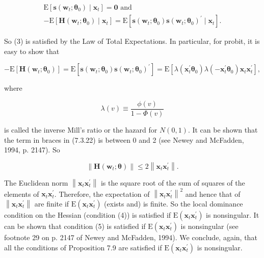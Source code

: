 \documentclass[10pt]{article}
\begin{document}
\begin{gather*}
\mathrm{E}\left[\mathbf{s}\left(\mathbf{w}_{t} ; \boldsymbol{\theta}_{0}\right) \mid \mathbf{x}_{t}\right]=\mathbf{0} \text { and } \\
-\mathrm{E}\left[\mathbf{H}\left(\mathbf{w}_{t} ; \boldsymbol{\theta}_{0}\right) \mid \mathbf{x}_{t}\right]=\mathrm{E}\left[\mathbf{s}\left(\mathbf{w}_{t} ; \boldsymbol{\theta}_{0}\right) \mathbf{s}\left(\mathbf{w}_{t} ; \boldsymbol{\theta}_{0}\right)^{\prime} \mid \mathbf{x}_{t}\right] . \tag{7.3.23}
\end{gather*}


So (3) is satisfied by the Law of Total Expectations. In particular, for probit, it is easy to show that


\begin{equation*}
-\mathrm{E}\left[\mathbf{H}\left(\mathbf{w}_{t} ; \boldsymbol{\theta}_{0}\right)\right]=\mathrm{E}\left[\mathbf{s}\left(\mathbf{w}_{t} ; \boldsymbol{\theta}_{0}\right) \mathbf{s}\left(\mathbf{w}_{t} ; \boldsymbol{\theta}_{0}\right)^{\prime}\right]=\mathrm{E}\left[\lambda\left(\mathbf{x}_{t}^{\prime} \boldsymbol{\theta}_{0}\right) \lambda\left(-\mathbf{x}_{t}^{\prime} \boldsymbol{\theta}_{0}\right) \mathbf{x}_{t} \mathbf{x}_{t}^{\prime}\right], \tag{7.3.24}
\end{equation*}


where


\begin{equation*}
\lambda(v) \equiv \frac{\phi(v)}{1-\Phi(v)} \tag{7.3.25}
\end{equation*}


is called the inverse Mill's ratio or the hazard for $N(0,1)$. It can be shown that the term in braces in (7.3.22) is between 0 and 2 (see Newey and McFadden, 1994, p. 2147). So


\begin{equation*}
\left\|\mathbf{H}\left(\mathbf{w}_{t} ; \boldsymbol{\theta}\right)\right\| \leq 2\left\|\mathbf{x}_{t} \mathbf{x}_{t}^{\prime}\right\| . \tag{7.3.26}
\end{equation*}


The Euclidean norm $\left\|\mathbf{x}_{t} \mathbf{x}_{t}^{\prime}\right\|$ is the square root of the sum of squares of the elements of $\mathbf{x}_{t} \mathbf{x}_{t}^{\prime}$. Therefore, the expectation of $\left\|\mathbf{x}_{t} \mathbf{x}_{t}^{\prime}\right\|^{2}$ and hence that of $\left\|\mathbf{x}_{t} \mathbf{x}_{t}^{\prime}\right\|$ are finite if $\mathrm{E}\left(\mathbf{x}_{t} \mathbf{x}_{t}^{\prime}\right)$ (exists and) is finite. So the local dominance condition on the Hessian (condition (4)) is satisfied if $\mathrm{E}\left(\mathbf{x}_{t} \mathbf{x}_{t}^{\prime}\right)$ is nonsingular. It can be shown that condition (5) is satisfied if $\mathrm{E}\left(\mathbf{x}_{t} \mathbf{x}_{t}^{\prime}\right)$ is nonsingular (see footnote 29 on p. 2147 of Newey and McFadden, 1994). We conclude, again, that all the conditions of Proposition 7.9 are satisfied if $\mathrm{E}\left(\mathbf{x}_{t} \mathbf{x}_{t}^{\prime}\right)$ is nonsingular.
\end{document}
